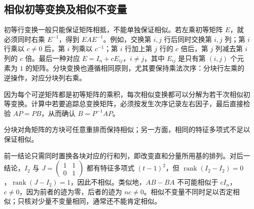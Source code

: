 \subsection{相似初等变换及相似不变量}

初等行变换一般只能保证矩阵相抵，不能单独保证相似。若左乘初等矩阵 $E$，就必须同时右乘 $E^{-1}$，得到 $EAE^{-1}$。例如，交换第 $i,j$ 行后同时交换第 $i,j$ 列；第 $i$ 行乘以 $c\ne0$ 后，第 $i$ 列乘以 $c^{-1}$；第 $i$ 行加上第 $j$ 行的 $c$ 倍后，第 $j$ 列减去第 $i$ 列的 $c$ 倍。最后一种对应 $E=I_n+cE_{ij}$，$i\ne j$，其中 $E_{ij}$ 是只有第 $(i,j)$ 个元素为 $1$ 的矩阵。分块变换也遵循相同原则，尤其要保持乘法次序：分块行左乘的逆操作，对应分块列右乘。

因为每个可逆矩阵都是初等矩阵的乘积，每次相似变换都可以分解为若干次相似初等变换。计算中若要追踪总变换矩阵，必须按发生次序记录左右因子，最后直接检验 $AP=PB$，从而确认 $B=P^{-1}AP$。

\begin{example}
分块对角矩阵的方块可任意重排而保持相似；另一方面，相同的特征多项式不足以保证相似。
\end{example}
\begin{solve}
前一结论只需同时置换各块对应的行和列，即改变直和分量所用基的排列。对后一结论，$I_2$ 与 $J=\begin{pmatrix}1&1\\0&1\end{pmatrix}$ 都有特征多项式 $(t-1)^2$，但 $\operatorname{rank}(I_2-I_2)=0$，$\operatorname{rank}(J-I_2)=1$，因此不相似。类似地，$AB-BA$ 不可能相似于 $cI_n$，$c\ne0$，因为前者的迹为零，后者的迹为 $nc\ne0$。相似不变量不同时足以否定相似；只核对少量不变量相同，通常还不能肯定相似。
\end{solve}

